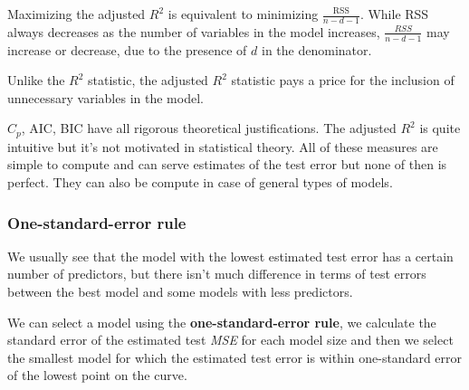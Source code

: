 Maximizing the adjusted $R^2$ is equivalent to minimizing $\frac{\text{RSS}}{n-d-1}$. While RSS always decreases as the number of variables in the model increases, $\frac{RSS}{n-d-1}$ may increase or decrease, due to the presence of $d$ in the denominator.

Unlike the $R^2$ statistic, the adjusted $R^2$ statistic pays a price for the inclusion of unnecessary variables in the model.

$C_p$, AIC, BIC have all rigorous theoretical justifications. The adjusted $R^2$ is quite intuitive but it's not motivated in statistical theory. All of these measures are simple to compute and can serve estimates of the test error but none of then is perfect. They can also be compute in case of general types of models.




\subsubsection*{One-standard-error rule}
We usually see that the model with the lowest estimated test error has a certain number of predictors, but there isn't much difference in terms of test errors between the best model and some models with less predictors.

We can select a model using the \textbf{one-standard-error rule}, we calculate the standard error of the estimated test \textit{MSE} for each model size and then we select the smallest model for which the estimated test error is within one-standard error of the lowest point on the curve.

